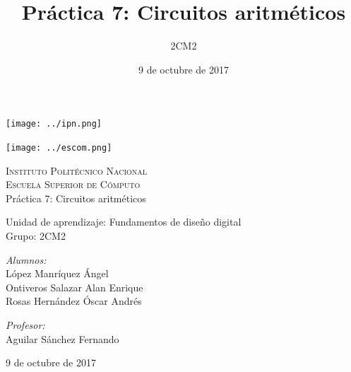 \documentclass[11pt]{article}
\date{9 de octubre de 2017}
\title{Práctica 7: Circuitos aritméticos}
\author{2CM2}
\begin{document}
		\begin{titlepage}
			\begin{center}
				
				
				\noindent
				\begin{minipage}{0.5\textwidth}
					\begin{flushleft} \large
						\texttt{[image: ../ipn.png]}
					\end{flushleft}
				\end{minipage}%
				\begin{minipage}{0.55\textwidth}
					\begin{flushright} \large
						\texttt{[image: ../escom.png]}
					\end{flushright}
				\end{minipage}
				
				\textsc{\LARGE Instituto Politécnico Nacional}\\[0.5cm]
				
				\textsc{\Large Escuela Superior de Cómputo}\\[1cm]
				
				
				{ \huge Práctica 7: Circuitos aritméticos \\[1cm] }
				
				{ \Large Unidad de aprendizaje: Fundamentos de diseño digital} \\[1cm]
				
				{ \Large Grupo: 2CM2 } \\[1cm]
				
				\noindent
				\begin{minipage}{0.5\textwidth}
					\begin{flushleft} \large
						\emph{Alumnos:}\\
						López Manríquez Ángel\\
						Ontiveros Salazar Alan Enrique\\
						Rosas Hernández Óscar Andrés
					\end{flushleft}
				\end{minipage}%
				\begin{minipage}{0.5\textwidth}
					\begin{flushright} \large
						\emph{Profesor:} \\
						Aguilar Sánchez Fernando
					\end{flushright}
				\end{minipage}
				
				\vfill
				
				{\large 9 de octubre de 2017}
			\end{center}
		\end{titlepage}
	
\end{document}
